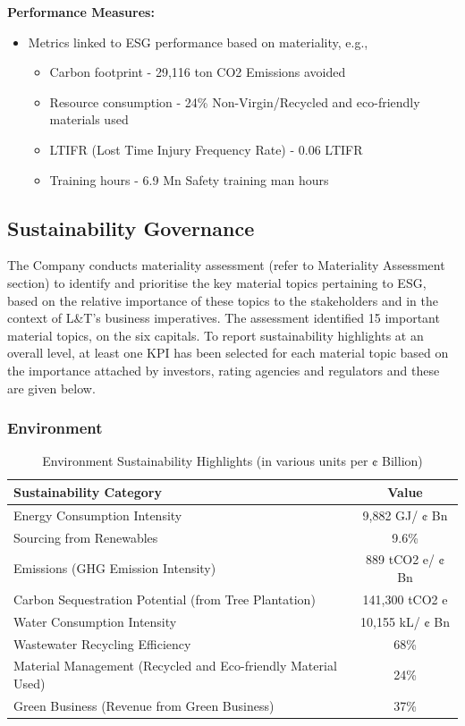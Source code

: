 \textbf{Performance Measures:}
\begin{itemize}
    \item Metrics linked to ESG performance based on materiality, e.g.,
    \begin{itemize}
        \item Carbon footprint - 29,116 ton CO2 Emissions avoided
        
        \item Resource consumption - 24\%
        Non-Virgin/Recycled and
        eco-friendly materials used
        \item LTIFR (Lost Time Injury Frequency Rate) - 0.06
        LTIFR
        \item Training hours - 6.9 Mn
        Safety training
        man hours
    \end{itemize}
\end{itemize}

\subsection{Sustainability Governance}

The Company conducts materiality assessment (refer to
Materiality Assessment section) to identify and prioritise the
key material topics pertaining to ESG, based on the relative
importance of these topics to the stakeholders and in the
context of L\&T’s business imperatives. The assessment identified
15 important material topics, on the six capitals.
To report sustainability highlights at an overall level, at least
one KPI has been selected for each material topic based on
the importance attached by investors, rating agencies and
regulators and these are given below.

\subsubsection{Environment}

\begin{table}[ht]
    \centering
    \caption{Environment Sustainability Highlights (in various units per ¢ Billion)}
    \begin{tabular}{|l|c|}
    \hline
    \textbf{Sustainability Category} & \textbf{Value} \\
    \hline
    Energy Consumption Intensity & 9,882 GJ/ ¢ Bn \\
    Sourcing from Renewables &  9.6\%\\
    Emissions (GHG Emission Intensity) & 889 tCO2 e/ ¢ Bn \\
    Carbon Sequestration Potential (from Tree Plantation) & 141,300 tCO2 e \\
    Water Consumption Intensity & 10,155 kL/ ¢ Bn \\
    Wastewater Recycling Efficiency & 68\% \\
    Material Management (Recycled and Eco-friendly Material Used) & 24\% \\
    Green Business (Revenue from Green Business) & 37\% \\
    \hline
    \end{tabular}
    \end{table}
    
